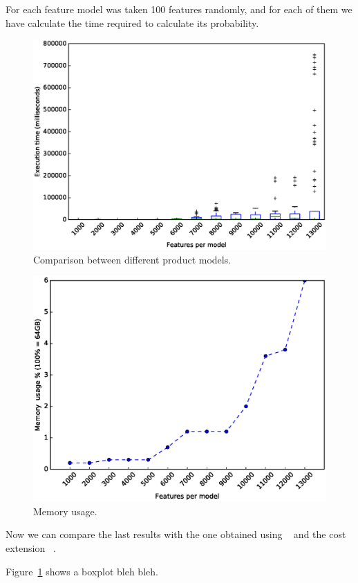 For each feature model was taken 100 features
randomly, and
for each of them we have calculate the 
time required to calculate its
probability.



\begin{figure}[h]
	\centering
	\linefigure
	\includegraphics[width=0.8\hsize,angle=0]{boxplot.eps}
	\linefigure
	\caption{Comparison between different product models.}\label{fig:plot:probs:boxplot}
\end{figure}


\begin{figure}[h]
	\centering
	\linefigure
	\includegraphics[width=0.8\hsize,angle=0]{boxplot_mem.eps}
	\linefigure
	\caption{Memory usage.}\label{fig:plot:probs:boxplotmem}
\end{figure}




Now we can compare the last results with the one obtained using \fodaPA~\cite{acl13}
and the cost extension \fodaPAc~\cite{clc16}.


Figure~\ref{fig:plot:probs:boxplot} shows a boxplot bleh bleh.





